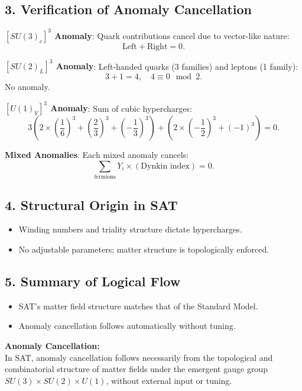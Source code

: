\documentclass[12pt]{article}
\begin{document}
\subsection*{3. Verification of Anomaly Cancellation}
\textbf{\([SU(3)_c]^3\) Anomaly}:
Quark contributions cancel due to vector-like nature:
\[
\text{Left} + \text{Right} = 0.
\]

\textbf{\([SU(2)_L]^3\) Anomaly}:
Left-handed quarks (3 families) and leptons (1 family):
\[
3 + 1 = 4, \quad 4 \equiv 0 \mod 2.
\]
No anomaly.

\textbf{\([U(1)_Y]^3\) Anomaly}:
Sum of cubic hypercharges:
\[
3 \left( 2 \times \left( \frac{1}{6} \right)^3 + \left( \frac{2}{3} \right)^3 + \left( -\frac{1}{3} \right)^3 \right) + \left( 2 \times \left( -\frac{1}{2} \right)^3 + (-1)^3 \right) = 0.
\]

\textbf{Mixed Anomalies}:
Each mixed anomaly cancels:
\[
\sum_{\text{fermions}} Y_i \times (\text{Dynkin index}) = 0.
\]

\subsection*{4. Structural Origin in SAT}
\begin{itemize}
    \item Winding numbers and triality structure dictate hypercharges.
    \item No adjustable parameters; matter structure is topologically enforced.
\end{itemize}

\subsection*{5. Summary of Logical Flow}
\begin{itemize}
    \item SAT’s matter field structure matches that of the Standard Model.
    \item Anomaly cancellation follows automatically without tuning.
\end{itemize}

\begin{mdframed}[linewidth=1pt, roundcorner=5pt, backgroundcolor=white]
\textbf{Anomaly Cancellation:} \\
In SAT, anomaly cancellation follows necessarily from the topological and combinatorial structure of matter fields under the emergent gauge group \( SU(3) \times SU(2) \times U(1) \), without external input or tuning.
\end{mdframed}
\end{document}

